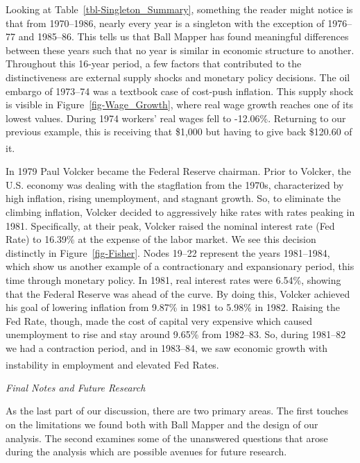 \documentclass[
  10pt,
  letterpaper,
  DIV=11,
  numbers=noendperiod]{scrartcl}
\begin{document}
Looking at Table~\ref{tbl-Singleton_Summary}, something the reader might
notice is that from 1970--1986, nearly every year is a singleton with
the exception of 1976--77 and 1985--86. This tells us that Ball Mapper
has found meaningful differences between these years such that no year
is similar in economic structure to another. Throughout this 16-year
period, a few factors that contributed to the distinctiveness are
external supply shocks and monetary policy decisions. The oil embargo of
1973--74 was a textbook case of cost-push inflation. This supply shock
is visible in Figure~\ref{fig-Wage_Growth}, where real wage growth
reaches one of its lowest values. During 1974 workers' real wages fell
to -12.06\%. Returning to our previous example, this is receiving that
\$1,000 but having to give back \$120.60 of
it.\textsuperscript{}

In 1979 Paul Volcker became the Federal Reserve chairman. Prior to
Volcker, the U.S. economy was dealing with the stagflation from the
1970s, characterized by high inflation, rising unemployment, and
stagnant growth. So, to eliminate the climbing inflation, Volcker
decided to aggressively hike rates with rates peaking in 1981.
Specifically, at their peak, Volcker raised the nominal interest rate
(Fed Rate) to 16.39\% at the expense of the labor market. We see this
decision distinctly in Figure~\ref{fig-Fisher}. Nodes 19--22 represent
the years 1981--1984, which show us another example of a contractionary
and expansionary period, this time through monetary policy. In 1981,
real interest rates were 6.54\%, showing that the Federal Reserve was
ahead of the curve. By doing this, Volcker achieved his goal of lowering
inflation from 9.87\% in 1981 to 5.98\% in 1982. Raising the Fed Rate,
though, made the cost of capital very expensive which caused
unemployment to rise and stay around 9.65\% from 1982--83. So, during
1981--82 we had a contraction period, and in 1983--84, we saw economic
growth with instability in employment and elevated Fed
Rates.\textsuperscript{}

\newpage

\emph{Final Notes and Future Research}

As the last part of our discussion, there are two primary areas. The
first touches on the limitations we found both with Ball Mapper and the
design of our analysis. The second examines some of the unanswered
questions that arose during the analysis which are possible avenues for
future research.
\end{document}
